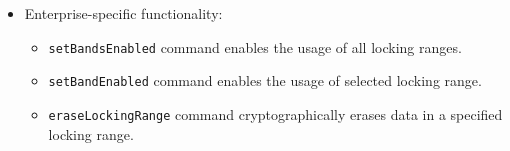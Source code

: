 \begin{itemize}
    \item Enterprise-specific functionality: \begin{itemize}
\item \verb|setBandsEnabled| command enables the usage of all locking ranges.
\item \verb|setBandEnabled| command enables the usage of selected locking range.
\item \verb|eraseLockingRange| command cryptographically erases data in a specified locking range.
    \end{itemize}
\end{itemize}






